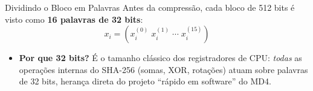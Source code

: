 \documentclass{beamer}
\begin{document}
\begin{frame}{Dividindo o Bloco em Palavras}
    Antes da compressão, cada bloco de 512 bits é visto como \textbf{16 palavras de 32 bits}:
    \[
        x_i = \left( x_i^{(0)}\; x_i^{(1)}\; \cdots\; x_i^{(15)} \right)
    \]
    \begin{center}
    \end{center}
    \begin{itemize}
        \footnotesize
        \item \textbf{Por que 32 bits?} É o tamanho clássico dos registradores de CPU: \textit{todas} as operações internas do SHA-256 (somas, XOR, rotações) atuam sobre palavras de 32 bits, herança direta do projeto ``rápido em software'' do MD4.
    \end{itemize}
\end{frame}
\end{document}
